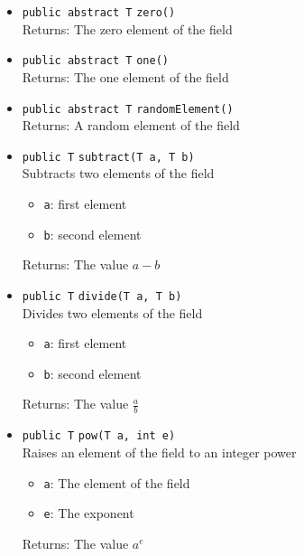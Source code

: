 \begin{itemize}
\item \lstinline|public abstract T| \lstinline|zero|\lstinline|()|\\
Returns: The zero element of the field



\item \lstinline|public abstract T| \lstinline|one|\lstinline|()|\\
Returns: The one element of the field



\item \lstinline|public abstract T| \lstinline|randomElement|\lstinline|()|\\
Returns: A random element of the field



\item \lstinline|public T| \lstinline|subtract|\lstinline|(T a, T b)|\\
Subtracts two elements of the field
\begin{itemize}
\item \lstinline|a|: first element
\item \lstinline|b|: second element
\end{itemize}

Returns: The value $a - b$

\item \lstinline|public T| \lstinline|divide|\lstinline|(T a, T b)|\\
Divides two elements of the field
\begin{itemize}
\item \lstinline|a|: first element
\item \lstinline|b|: second element
\end{itemize}

Returns: The value $\frac{a}{b}$

\item \lstinline|public T| \lstinline|pow|\lstinline|(T a, int e)|\\
Raises an element of the field to an integer power
\begin{itemize}
\item \lstinline|a|: The element of the field
\item \lstinline|e|: The exponent
\end{itemize}

Returns: The value $a^e$

\end{itemize}

